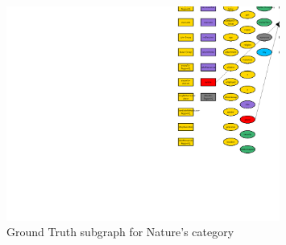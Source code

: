 \documentclass{article}%
\begin{document}
\begin{figure}[ht]%
\centering%
\includegraphics[width=0.8\textwidth]{images/categoryOfNature.png}%
\caption{Ground Truth subgraph for Nature's category}%
\end{figure}

%
\end{document}
